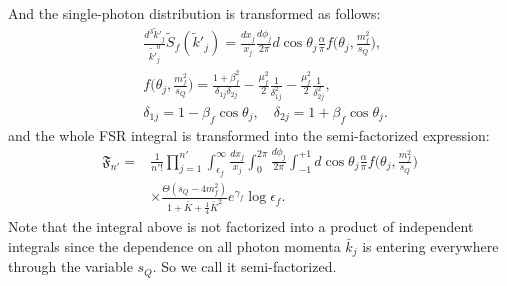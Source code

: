 And the single-photon distribution is transformed as follows:
\begin{align}
&\frac{d^3\widetilde{k}'_j}{\widetilde{k'}^0_j}\widetilde{S}_f(\widetilde{k}'_j)=\frac{dx_j}{x_j}\frac{d\phi_j}{2\pi}d\cos\theta_j\frac{\alpha}{\pi}f\biggl(\theta_j,\frac{m^2_f}{s_Q}\biggr),\nonumber\\
&f\biggl(\theta_j,\frac{m^2_f}{s_Q}\biggr)=\frac{1+\beta^2_f}{\delta_{1j}\delta_{2j}}-\frac{\mu^2_f}{2}\frac{1}{\delta^2_{1j}}-\frac{\mu^2_f}{2}\frac{1}{\delta^2_{2j}},\nonumber\\
&\delta_{1j}=1-\beta_f\cos\theta_j,\quad
\delta_{2j}=1+\beta_f\cos\theta_j.
\end{align}
and the whole FSR integral is transformed into the semi-factorized expression:
\begin{align}
\mathfrak{F}_{n'}=&\frac{1}{n'!}\prod_{j=1}^{n'}\int_{\epsilon_f}^{\infty}\frac{dx_j}{x_j}\int_{0}^{2\pi}\frac{d\phi_j}{2\pi}\int_{-1}^{+1}d\cos\theta_j\frac{\alpha}{\pi}f\biggl(\theta_j,\frac{m^2_f}{s_Q}\biggr)\nonumber
\\
&\times\frac{\Theta(s_Q-4m^2_f)}{1+\bar{K}+\frac{1}{4}\bar{K}^2}e^{\gamma_f}\log\epsilon_f.
\end{align}
Note that the integral above is not factorized into a product of independent integrals since the dependence on all photon momenta $\bar{k}_j$ is entering everywhere through the variable $s_Q$. So we call it semi-factorized.

